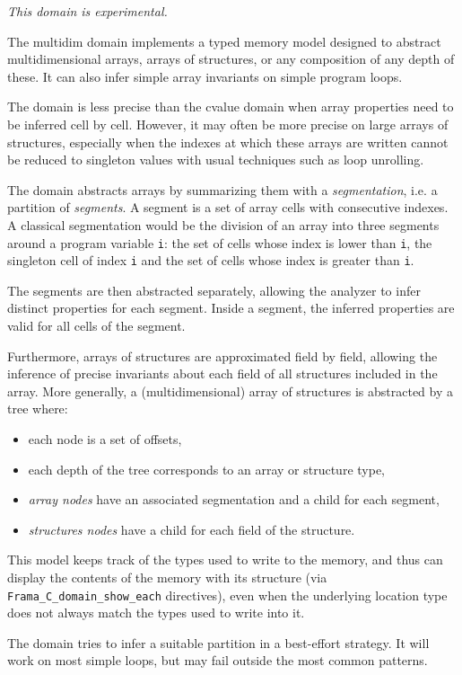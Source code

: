 \documentclass{frama-c-book}
\begin{document}
\emph{This domain is experimental.}

The multidim domain implements a typed memory model designed to abstract
multidimensional arrays, arrays of structures, or any composition of any depth
of these. It can also infer simple array invariants on simple program loops.

The domain is less precise than the cvalue domain when array properties need
to be inferred cell by cell.
However, it may often be more precise on large arrays of structures, especially
when the indexes at which these arrays are written cannot be
reduced to singleton values with usual techniques such as loop unrolling.

The domain abstracts arrays by summarizing them with a {\it segmentation}, i.e. a
partition of {\it segments}. A segment is a set of array cells with consecutive
indexes. A classical segmentation would be the division of an array into three
segments around a program variable {\tt i}: the set of cells whose index is
lower than {\tt i}, the singleton cell of index {\tt i} and the set of cells
whose index is greater than {\tt i}.


The segments are then abstracted separately, allowing the analyzer to infer
distinct properties for each segment. Inside a segment, the inferred
properties are valid for all cells of the segment.

Furthermore, arrays of structures are approximated field by field, allowing the
inference of precise invariants about each field of all structures included in
the array. More generally, a (multidimensional) array of structures is
abstracted by a tree where:
\begin{itemize}
  \item each node is a set of offsets,
  \item each depth of the tree corresponds to an array or structure type,
  \item {\it array nodes} have an associated segmentation and a child for
        each segment,
  \item {\it structures nodes} have a child for each field of the structure.
\end{itemize}

This model keeps track of the types used to write to the memory, and thus
can display the contents of the memory with its structure (via
\lstinline|Frama_C_domain_show_each| directives), even when the underlying
location type does not always match the types used to write into it.

The domain tries to infer a suitable partition in a best-effort strategy. It
will work on most simple loops, but may fail outside the most common patterns.
\end{document}
